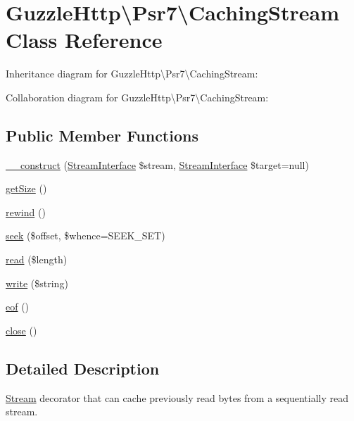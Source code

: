 \hypertarget{classGuzzleHttp_1_1Psr7_1_1CachingStream}{}\section{Guzzle\+Http\textbackslash{}Psr7\textbackslash{}Caching\+Stream Class Reference}
\label{classGuzzleHttp_1_1Psr7_1_1CachingStream}


Inheritance diagram for Guzzle\+Http\textbackslash{}Psr7\textbackslash{}Caching\+Stream\+:


Collaboration diagram for Guzzle\+Http\textbackslash{}Psr7\textbackslash{}Caching\+Stream\+:
\subsection*{Public Member Functions}
\begin{DoxyCompactItemize}
\item 
\hyperlink{classGuzzleHttp_1_1Psr7_1_1CachingStream_af960a36e990648cbf5f3da2a8ce70ac7}{\+\_\+\+\_\+construct} (\hyperlink{interfacePsr_1_1Http_1_1Message_1_1StreamInterface}{Stream\+Interface} \$stream, \hyperlink{interfacePsr_1_1Http_1_1Message_1_1StreamInterface}{Stream\+Interface} \$target=null)
\item 
\hyperlink{classGuzzleHttp_1_1Psr7_1_1CachingStream_a4a4c0693dfcec940ea1f14c686666a4d}{get\+Size} ()
\item 
\hyperlink{classGuzzleHttp_1_1Psr7_1_1CachingStream_ab893b58302d56d6946ca7355b5816ae4}{rewind} ()
\item 
\hyperlink{classGuzzleHttp_1_1Psr7_1_1CachingStream_a6ae3ecc8a3a8073639793e81431a4a83}{seek} (\$offset, \$whence=S\+E\+E\+K\+\_\+\+S\+ET)
\item 
\hyperlink{classGuzzleHttp_1_1Psr7_1_1CachingStream_ae9f074ce44f716bcc5d5ef5e4357785b}{read} (\$length)
\item 
\hyperlink{classGuzzleHttp_1_1Psr7_1_1CachingStream_a8a6d9a820f1a4e50bbb965febb5acc36}{write} (\$string)
\item 
\hyperlink{classGuzzleHttp_1_1Psr7_1_1CachingStream_ae247cc3e854b0e58fc4b00a0b5fcc9ab}{eof} ()
\item 
\hyperlink{classGuzzleHttp_1_1Psr7_1_1CachingStream_ac135bf39923eb56263280d2e63c8bc96}{close} ()
\end{DoxyCompactItemize}


\subsection{Detailed Description}
\hyperlink{classGuzzleHttp_1_1Psr7_1_1Stream}{Stream} decorator that can cache previously read bytes from a sequentially read stream. 

